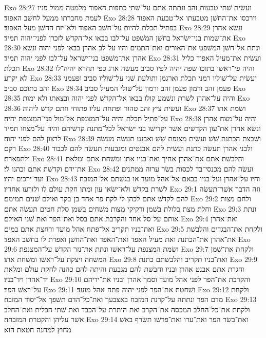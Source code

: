Exo 28:27  ועשׂית שׁתי טבעות זהב ונתתה אתם על־שׁתי כתפות האפוד מלמטה ממול פניו לעמת מחברתו ממעל לחשׁב האפוד׃
Exo 28:28  וירכסו את־החשׁן מטבעתו אל־טבעת האפוד בפתיל תכלת להיות על־חשׁב האפוד ולא־יזח החשׁן מעל האפוד׃
Exo 28:29  ונשׂא אהרן את־שׁמות בני־ישׂראל בחשׁן המשׁפט על־לבו בבאו אל־הקדשׁ לזכרן לפני־יהוה תמיד׃
Exo 28:30  ונתת אל־חשׁן המשׁפט את־האורים ואת־התמים והיו על־לב אהרן בבאו לפני יהוה ונשׂא אהרן את־משׁפט בני־ישׂראל על־לבו לפני יהוה תמיד׃
Exo 28:31  ועשׂית את־מעיל האפוד כליל תכלת׃
Exo 28:32  והיה פי־ראשׁו בתוכו שׂפה יהיה לפיו סביב מעשׂה ארג כפי תחרא יהיה־לו לא יקרע׃
Exo 28:33  ועשׂית על־שׁוליו רמני תכלת וארגמן ותולעת שׁני על־שׁוליו סביב ופעמני זהב בתוכם סביב׃
Exo 28:34  פעמן זהב ורמון פעמן זהב ורמון על־שׁולי המעיל סביב׃
Exo 28:35  והיה על־אהרן לשׁרת ונשׁמע קולו בבאו אל־הקדשׁ לפני יהוה ובצאתו ולא ימות׃
Exo 28:36  ועשׂית ציץ זהב טהור ופתחת עליו פתוחי חתם קדשׁ ליהוה׃
Exo 28:37  ושׂמת אתו על־פתיל תכלת והיה על־המצנפת אל־מול פני־המצנפת יהיה׃
Exo 28:38  והיה על־מצח אהרן ונשׂא אהרן את־עון הקדשׁים אשׁר יקדישׁו בני ישׂראל לכל־מתנת קדשׁיהם והיה על־מצחו תמיד לרצון להם לפני יהוה׃
Exo 28:39  ושׁבצת הכתנת שׁשׁ ועשׂית מצנפת שׁשׁ ואבנט תעשׂה מעשׂה רקם׃
Exo 28:40  ולבני אהרן תעשׂה כתנת ועשׂית להם אבנטים ומגבעות תעשׂה להם לכבוד ולתפארת׃
Exo 28:41  והלבשׁת אתם את־אהרן אחיך ואת־בניו אתו ומשׁחת אתם ומלאת את־ידם וקדשׁת אתם וכהנו לי׃
Exo 28:42  ועשׂה להם מכנסי־בד לכסות בשׂר ערוה ממתנים ועד־ירכים יהיו׃
Exo 28:43  והיו על־אהרן ועל־בניו בבאם אל־אהל מועד או בגשׁתם אל־המזבח לשׁרת בקדשׁ ולא־ישׂאו עון ומתו חקת עולם לו ולזרעו אחריו׃
Exo 29:1  וזה הדבר אשׁר־תעשׂה להם לקדשׁ אתם לכהן לי לקח פר אחד בן־בקר ואילם שׁנים תמימם׃
Exo 29:2  ולחם מצות וחלת מצת בלולת בשׁמן ורקיקי מצות משׁחים בשׁמן סלת חטים תעשׂה אתם׃
Exo 29:3  ונתת אותם על־סל אחד והקרבת אתם בסל ואת־הפר ואת שׁני האילם׃
Exo 29:4  ואת־אהרן ואת־בניו תקריב אל־פתח אהל מועד ורחצת אתם במים׃
Exo 29:5  ולקחת את־הבגדים והלבשׁת את־אהרן את־הכתנת ואת מעיל האפד ואת־האפד ואת־החשׁן ואפדת לו בחשׁב האפד׃
Exo 29:6  ושׂמת המצנפת על־ראשׁו ונתת את־נזר הקדשׁ על־המצנפת׃
Exo 29:7  ולקחת את־שׁמן המשׁחה ויצקת על־ראשׁו ומשׁחת אתו׃
Exo 29:8  ואת־בניו תקריב והלבשׁתם כתנת׃
Exo 29:9  וחגרת אתם אבנט אהרן ובניו וחבשׁת להם מגבעת והיתה להם כהנה לחקת עולם ומלאת יד־אהרן ויד־בניו׃
Exo 29:10  והקרבת את־הפר לפני אהל מועד וסמך אהרן ובניו את־ידיהם על־ראשׁ הפר׃
Exo 29:11  ושׁחטת את־הפר לפני יהוה פתח אהל מועד׃
Exo 29:12  ולקחת מדם הפר ונתתה על־קרנת המזבח באצבעך ואת־כל־הדם תשׁפך אל־יסוד המזבח׃
Exo 29:13  ולקחת את־כל־החלב המכסה את־הקרב ואת היתרת על־הכבד ואת שׁתי הכלית ואת־החלב אשׁר עליהן והקטרת המזבחה׃
Exo 29:14  ואת־בשׂר הפר ואת־ערו ואת־פרשׁו תשׂרף באשׁ מחוץ למחנה חטאת הוא׃
